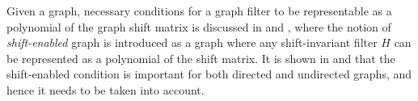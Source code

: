 \documentclass[journal]{IEEEtran}
\begin{document}
Given a graph, necessary conditions for a graph filter to be representable as a polynomial of the graph shift matrix is discussed in \cite{Liyanchen2018} and \cite{Liyanchen2021}, where the notion of \emph{shift-enabled} graph is introduced as a graph where any shift-invariant filter $H$ can be represented as a polynomial of the shift matrix.
It is shown in \cite{Liyanchen2018} and \cite{Liyanchen2021} that the shift-enabled condition \cite{Liyanchen2018} is important for both directed and undirected graphs, and hence it needs to be taken into account.  %



\end{document}

